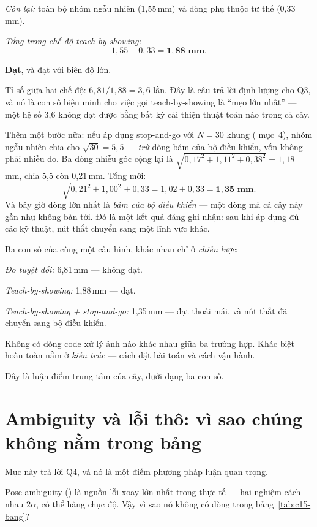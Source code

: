 \documentclass[../../marker.tex]{subfiles}
\begin{document}
\emph{Còn lại:} toàn bộ nhóm ngẫu nhiên (1,55\,mm) và dòng phụ thuộc tư thế (0,33\,mm).

\emph{Tổng trong chế độ teach-by-showing:}
\[
1{,}55 + 0{,}33 = \mathbf{1{,}88\text{ mm}}.
\]

\textbf{Đạt}, và đạt với biên độ lớn.

Tỉ số giữa hai chế độ: \(6{,}81/1{,}88 = 3{,}6\) lần. Đây là câu trả lời định lượng cho Q3, và nó là con số biện minh cho việc  gọi teach-by-showing là ``mẹo lớn nhất'' --- một hệ số 3,6 không đạt được bằng bất kỳ cải thiện thuật toán nào trong cả cây.

Thêm một bước nữa: nếu áp dụng stop-and-go với \(N = 30\) khung ( mục~4), nhóm ngẫu nhiên chia cho \(\sqrt{30} = 5{,}5\) --- \emph{trừ} dòng bám của bộ điều khiển, vốn không phải nhiễu đo. Ba dòng nhiễu góc cộng lại là \(\sqrt{0{,}17^2+1{,}11^2+0{,}38^2} = 1{,}18\) mm, chia 5,5 còn 0,21\,mm. Tổng mới:
\[
\sqrt{0{,}21^2 + 1{,}00^2} + 0{,}33 = 1{,}02 + 0{,}33 = \mathbf{1{,}35\text{ mm}}.
\]
Và bây giờ dòng lớn nhất là \emph{bám của bộ điều khiển} --- một dòng mà cả cây này gần như không bàn tới. Đó là một kết quả đáng ghi nhận: sau khi áp dụng đủ các kỹ thuật, nút thắt chuyển sang một lĩnh vực khác.

\begin{cannho}
Ba con số của cùng một cấu hình, khác nhau chỉ ở \emph{chiến lược}:

\emph{Đo tuyệt đối:} 6,81\,mm --- không đạt.

\emph{Teach-by-showing:} 1,88\,mm --- đạt.

\emph{Teach-by-showing + stop-and-go:} 1,35\,mm --- đạt thoải mái, và nút thắt đã chuyển sang bộ điều khiển.

Không có dòng code xử lý ảnh nào khác nhau giữa ba trường hợp. Khác biệt hoàn toàn nằm ở \emph{kiến trúc} --- cách đặt bài toán và cách vận hành.

Đây là luận điểm trung tâm của cây, dưới dạng ba con số.
\end{cannho}

\section{Ambiguity và lỗi thô: vì sao chúng không nằm trong bảng}

Mục này trả lời Q4, và nó là một điểm phương pháp luận quan trọng.

Pose ambiguity () là nguồn lỗi xoay lớn nhất trong thực tế --- hai nghiệm cách nhau \(2\alpha\), có thể hàng chục độ. Vậy vì sao nó không có dòng trong bảng~\ref{tab:c15-bang}?
\end{document}
